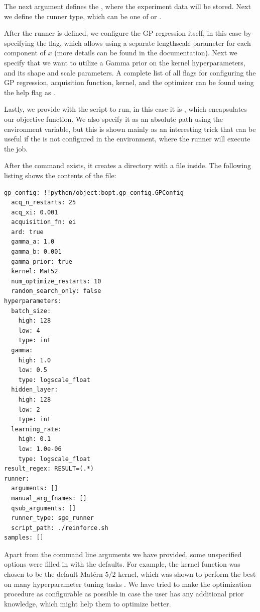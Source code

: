 The next argument  defines the , where the experiment data will be stored. Next we define the runner type, which can be one of  or .

After the runner is defined, we configure the GP regression itself, in this case by specifying the  flag, which allows using a separate lengthscale parameter for each component of $x$ (more details can be found in the \cite{gpy} documentation). Next we specify that we want to utilize a Gamma prior on the kernel hyperparameters, and its shape and scale parameters. A complete list of all flags for configuring the GP regression, acquisition function, kernel, and the optimizer can be found using the help flag as .

Lastly, we provide \bopt with the script to run, in this case it is , which encapsulates our objective function. We also specify it as an absolute path using the  environment variable, but this is shown mainly as an interesting trick that can be useful if the  is not configured in the environment, where the runner will execute the job.

After the command exists, it creates a directory  with a  file inside. The following listing shows the contents of the file:

\begin{center}
\begin{verbatim}
gp_config: !!python/object:bopt.gp_config.GPConfig
  acq_n_restarts: 25
  acq_xi: 0.001
  acquisition_fn: ei
  ard: true
  gamma_a: 1.0
  gamma_b: 0.001
  gamma_prior: true
  kernel: Mat52
  num_optimize_restarts: 10
  random_search_only: false
hyperparameters:
  batch_size:
    high: 128
    low: 4
    type: int
  gamma:
    high: 1.0
    low: 0.5
    type: logscale_float
  hidden_layer:
    high: 128
    low: 2
    type: int
  learning_rate:
    high: 0.1
    low: 1.0e-06
    type: logscale_float
result_regex: RESULT=(.*)
runner:
  arguments: []
  manual_arg_fnames: []
  qsub_arguments: []
  runner_type: sge_runner
  script_path: ./reinforce.sh
samples: []
\end{verbatim}
\end{center}

Apart from the command line arguments we have provided, some unspecified options were filled in with the defaults. For example, the kernel function was chosen to be the default Mat\'ern $5/2$ kernel, which was shown to perform the best on many hyperparameter tuning tasks \citep{snoek2012practical}. We have tried to make the optimization procedure as configurable as possible in case the user has any additional prior knowledge, which might help them to optimize better.

